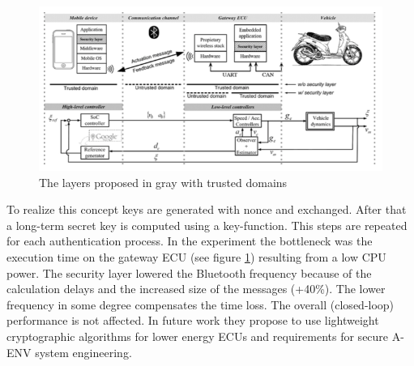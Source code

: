 \documentclass[12pt,a4paper]{article}
\begin{document}
\begin{figure}[h]
\begin{center}
	\includegraphics[scale=0.6]{img/security_layer_bt.png}
\caption{The layers proposed in gray with trusted domains   \cite{DBLP:journals/esl/DardanelliMTZSKH13}}
\label{img_bt_attack_bluesnarfer}
\end{center}
\end{figure}
To realize this concept keys are generated with nonce and exchanged. After that a long-term secret key is computed using a key-function. This steps are repeated for each authentication process. In the experiment the bottleneck was the execution time on the gateway ECU (see figure \ref{img_bt_attack_bluesnarfer}) resulting from a low CPU power. The security layer lowered the Bluetooth frequency because of the calculation delays and the increased size of the messages (+40\%). The lower frequency in some degree compensates the time loss. The overall (closed-loop) performance is not affected. In future work they propose to use lightweight cryptographic algorithms for lower energy ECUs and requirements for secure A-ENV system engineering.
\end{document}
